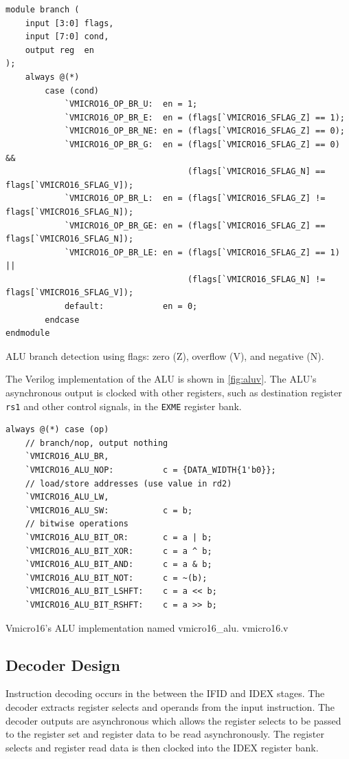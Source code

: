 \begin{listing}[H]
\centering
\begin{verbatim}
module branch (
    input [3:0] flags,
    input [7:0] cond,
    output reg  en
);
    always @(*)
        case (cond)
            `VMICRO16_OP_BR_U:  en = 1;
            `VMICRO16_OP_BR_E:  en = (flags[`VMICRO16_SFLAG_Z] == 1);
            `VMICRO16_OP_BR_NE: en = (flags[`VMICRO16_SFLAG_Z] == 0);
            `VMICRO16_OP_BR_G:  en = (flags[`VMICRO16_SFLAG_Z] == 0) && 
                                     (flags[`VMICRO16_SFLAG_N] == flags[`VMICRO16_SFLAG_V]);
            `VMICRO16_OP_BR_L:  en = (flags[`VMICRO16_SFLAG_Z] != flags[`VMICRO16_SFLAG_N]);
            `VMICRO16_OP_BR_GE: en = (flags[`VMICRO16_SFLAG_Z] == flags[`VMICRO16_SFLAG_N]);
            `VMICRO16_OP_BR_LE: en = (flags[`VMICRO16_SFLAG_Z] == 1) || 
                                     (flags[`VMICRO16_SFLAG_N] != flags[`VMICRO16_SFLAG_V]);
            default:            en = 0;
        endcase
endmodule
\end{verbatim}
\caption{ALU branch detection using flags: zero (Z), overflow (V), and negative (N).}
\end{listing}


The Verilog implementation of the ALU is shown in \cref{fig:aluv}. The ALU's asynchronous output is clocked with other registers, such as destination register \verb|rs1| and other control signals, in the \verb|EXME| register bank.
\begin{listing}[H]
\centering
\begin{verbatim}
always @(*) case (op)
    // branch/nop, output nothing
    `VMICRO16_ALU_BR,
    `VMICRO16_ALU_NOP:          c = {DATA_WIDTH{1'b0}};
    // load/store addresses (use value in rd2)
    `VMICRO16_ALU_LW,
    `VMICRO16_ALU_SW:           c = b;
    // bitwise operations
    `VMICRO16_ALU_BIT_OR:       c = a | b;
    `VMICRO16_ALU_BIT_XOR:      c = a ^ b;
    `VMICRO16_ALU_BIT_AND:      c = a & b;
    `VMICRO16_ALU_BIT_NOT:      c = ~(b);
    `VMICRO16_ALU_BIT_LSHFT:    c = a << b;
    `VMICRO16_ALU_BIT_RSHFT:    c = a >> b;
\end{verbatim}
\caption{Vmicro16's ALU implementation named vmicro16\_alu. vmicro16.v}
\label{fig:aluv}
\end{listing}




\subsection{Decoder Design}
Instruction decoding occurs in the between the IFID and IDEX stages. 
The decoder extracts register selects and operands from the input instruction. The decoder outputs are asynchronous which allows the register selects to be passed to the register set and register data to be read asynchronously. The register selects and register read data is then clocked into the IDEX register bank.

